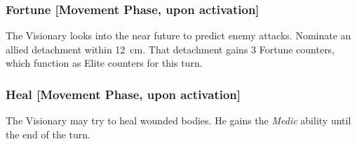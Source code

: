 \subsubsection{Fortune [Movement Phase, upon activation]}

The Visionary looks into the near future to predict enemy attacks. Nominate an allied detachment within 12~cm. That detachment gains 3 Fortune counters, which function as Elite counters for this turn.

\subsubsection{Heal [Movement Phase, upon activation]}

The Visionary may try to heal wounded bodies. He gains the \textit{Medic} ability until the end of the turn.
